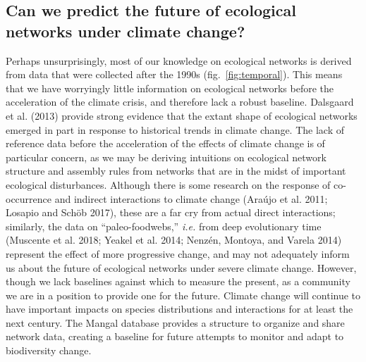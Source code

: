 \documentclass[11pt]{article}
\begin{document}
\hypertarget{can-we-predict-the-future-of-ecological-networks-under-climate-change}{%
\subsection{Can we predict the future of ecological networks under
climate
change?}\label{can-we-predict-the-future-of-ecological-networks-under-climate-change}}

Perhaps unsurprisingly, most of our knowledge on ecological networks is
derived from data that were collected after the 1990s
(fig.~\ref{fig:temporal}). This means that we have worryingly little
information on ecological networks before the acceleration of the
climate crisis, and therefore lack a robust baseline. Dalsgaard et al.
(2013) provide strong evidence that the extant shape of ecological
networks emerged in part in response to historical trends in climate
change. The lack of reference data before the acceleration of the
effects of climate change is of particular concern, as we may be
deriving intuitions on ecological network structure and assembly rules
from networks that are in the midst of important ecological
disturbances. Although there is some research on the response of
co-occurrence and indirect interactions to climate change (Araújo et al.
2011; Losapio and Schöb 2017), these are a far cry from actual direct
interactions; similarly, the data on ``paleo-foodwebs,'' \emph{i.e.}
from deep evolutionary time (Muscente et al. 2018; Yeakel et al. 2014;
Nenzén, Montoya, and Varela 2014) represent the effect of more
progressive change, and may not adequately inform us about the future of
ecological networks under severe climate change. However, though we lack
baselines against which to measure the present, as a community we are in
a position to provide one for the future. Climate change will continue
to have important impacts on species distributions and interactions for
at least the next century. The Mangal database provides a structure to
organize and share network data, creating a baseline for future attempts
to monitor and adapt to biodiversity change.
\end{document}
